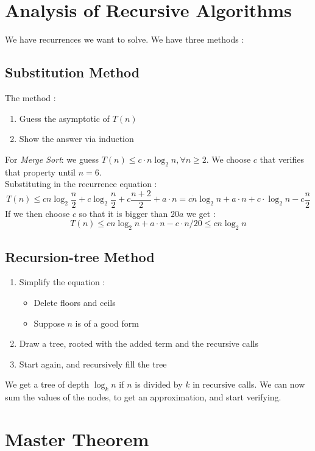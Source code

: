 \documentclass{cours}
\begin{document}
\section{Analysis of Recursive Algorithms}
We have recurrences we want to solve. We have three methods : 


\subsection{Substitution Method}
The method :
\begin{enumerate}
    \item Guess the asymptotic of $T(n)$
    \item Show the answer via induction
\end{enumerate}
For \textsl{Merge Sort}: we guess $T(n) \leq c \cdot n\log_{2}n, \forall n \geq 2$. We choose $c$ that verifies that property until $n = 6$. \\
Substituting in the recurrence equation : \[T(n) \leq cn\log_{2}\frac{n}{2} + c\log_{2}\frac{n}{2} + c\frac{n+2}{2} + a\cdot n = c \dot n\log_{2}n + a \cdot n + c \cdot \log_{2}n - c\frac{n}{2}\]
If we then choose $c$ so that it is bigger than $20a$ we get : 
\[T(n) \leq cn\log_{2}n + a\cdot n - c\cdot n/20 \leq cn\log_{2}n\]

\subsection{Recursion-tree Method}
\begin{enumerate}
    \item Simplify the equation : 
    \begin{itemize}
        \item Delete floors and ceils
        \item Suppose $n$ is of a good form
    \end{itemize}
    \item Draw a tree, rooted with the added term and the recursive calls
    \item Start again, and recursively fill the tree
\end{enumerate}
We get a tree of depth $\log_{k}n$ if $n$ is divided by $k$ in recursive calls. We can now sum the values of the nodes, to get an approximation, and start verifying.

\section{Master Theorem}
\end{document}
